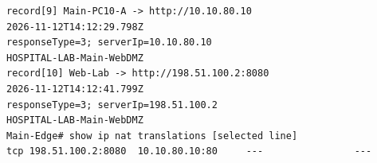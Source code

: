 \begin{Verbatim}[fontsize=\small,frame=single]
record[9] Main-PC10-A -> http://10.10.80.10
2026-11-12T14:12:29.798Z
responseType=3; serverIp=10.10.80.10
HOSPITAL-LAB-Main-WebDMZ
record[10] Web-Lab -> http://198.51.100.2:8080
2026-11-12T14:12:41.799Z
responseType=3; serverIp=198.51.100.2
HOSPITAL-LAB-Main-WebDMZ
Main-Edge# show ip nat translations [selected line]
tcp 198.51.100.2:8080  10.10.80.10:80     ---                ---
\end{Verbatim}
